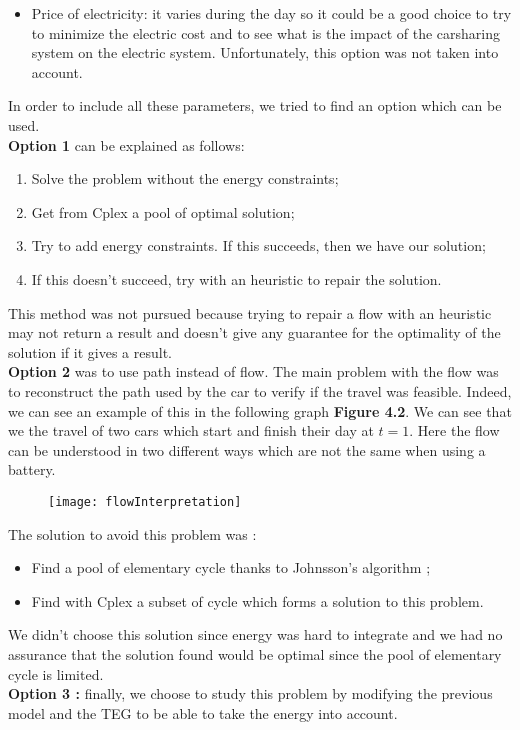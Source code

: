 \begin{bibunit}[ieeetr]
\begin{itemize}
\item
Price of electricity: it varies during the day so it could be a good choice to try to minimize the electric cost and to see what is the impact of the carsharing system on the electric system.
Unfortunately, this option was not taken into account.
\end{itemize}
 
In order to include all these parameters, we tried to find an option which can be used.\\
\textbf{Option 1} can be explained as follows: 
\begin{enumerate}
\item
Solve the problem without the energy constraints;
\item
Get from Cplex a pool of optimal solution;
\item
Try to add energy constraints. If this succeeds, then we have our solution;
\item
If this doesn't succeed, try with an heuristic to repair the solution.
\end{enumerate}
This method was not pursued because trying to repair a flow with an heuristic may not return a result and doesn't give any guarantee for the optimality of the solution if it gives a result.\\
\textbf{Option 2} was to use path instead of flow.
The main problem with the flow was to reconstruct the path used by the car to verify if the travel was feasible.
Indeed, we can see an example of this in the following graph \textbf{Figure  4.2}.
We can see that we the travel of two cars which start and finish their day at $t=1$.
Here the flow can be understood in two different ways which are not the same when using a battery.

\begin{figure}[!h]
\texttt{[image: flowInterpretation]}
\end{figure}

The solution to avoid this problem was :
\begin{itemize}
\item
Find a pool of elementary cycle thanks to Johnsson's algorithm \cite{johnson_finding_1975};
\item
Find with Cplex a subset of cycle which forms a solution to this problem.
\end{itemize}

We didn't choose this solution since energy was hard to integrate and we had no assurance that the solution found would be optimal since the pool of elementary cycle is limited.\\
\textbf{Option 3 :} finally, we choose to study this problem by modifying the previous model and the TEG to be able to take the energy into account.


\end{bibunit}
